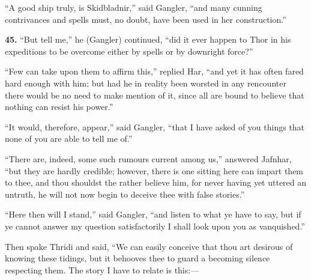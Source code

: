 ``A good ship truly, is Skidbladnir,'' said Gangler, ``and many cunning
contrivances and spells must, no doubt, have been used in her
construction.''


\textbf{45.} ``But tell me,'' he (Gangler) continued, ``did it ever happen to
Thor in his expeditions to be overcome either by spells or by
downright force?''

``Few can take upon them to affirm this,'' replied Har, ``and yet it has
often fared hard enough with him; but had he in reality been worsted
in any rencounter there would be no need to make mention of it, since
all are bound to believe that nothing can resist his power.''

``It would, therefore, appear,'' said Gangler, ``that I have asked of you
things that none of you are able to tell me of.''

``There are, indeed, some such rumours current among us,'' answered
Jafnhar, ``but they are hardly credible; however, there is one sitting
here can impart them to thee, and thou shouldst the rather believe
him, for never having yet uttered an untruth, he will not now begin to
deceive thee with false stories.''

``Here then will I stand,'' said Gangler, ``and listen to what ye have to
say, but if ye cannot answer my question satisfactorily I shall look
upon you as vanquished.''

Then spake Thridi and said, ``We can easily conceive that thou art
desirous of knowing these tidings, but it behooves thee to guard a
becoming silence respecting them. The story I have to relate is
this:—

